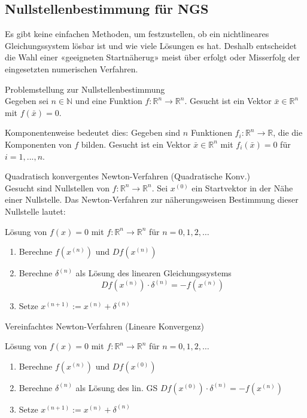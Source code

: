 \raggedcolumns
\columnbreak

\subsection{Nullstellenbestimmung für NGS}

\begin{remark}
    Es gibt keine einfachen Methoden, um festzustellen, ob ein nichtlineares Gleichungssystem lösbar ist und wie viele Lösungen es hat. Deshalb entscheidet die Wahl
    einer «geeigneten Startnäherug» meist über erfolgt oder Misserfolg der eingesetzten numerischen Verfahren.
\end{remark}

\begin{definition}{Problemstellung zur Nullstellenbestimmung}\\
Gegeben sei $n \in \mathbb{N}$ und eine Funktion $f: \mathbb{R}^n \rightarrow \mathbb{R}^n$. Gesucht ist ein Vektor $\bar{x} \in \mathbb{R}^n$ mit $f(\bar{x}) = 0$.

Komponentenweise bedeutet dies: Gegeben sind $n$ Funktionen $f_i: \mathbb{R}^n \rightarrow \mathbb{R}$, die die Komponenten von $f$ bilden. Gesucht ist ein Vektor $\bar{x} \in \mathbb{R}^n$ mit $f_i(\bar{x}) = 0$ für $i = 1, ..., n$.
\end{definition}

\begin{concept}{Quadratisch konvergentes Newton-Verfahren} \small{(Quadratische Konv.)}\\
    \normalsize
    Gesucht sind Nullstellen von $f: \mathbb{R}^n \rightarrow \mathbb{R}^n$. Sei $x^{(0)}$ ein Startvektor in der Nähe einer Nullstelle. 
    Das Newton-Verfahren zur näherungsweisen Bestimmung dieser Nullstelle lautet:

    Lösung von $f(x)=0$ mit $f: \mathbb{R}^n \rightarrow \mathbb{R}^n$ für $n=0,1,2, \ldots$
    \begin{enumerate}
        \item Berechne $f(x^{(n)})$ und $D f(x^{(n)})$
        \item Berechne $\delta^{(n)}$ als Lösung des linearen Gleichungssystems
        $$Df(x^{(n)}) \cdot \delta^{(n)} = -f(x^{(n)})$$
        \item Setze $x^{(n+1)} := x^{(n)} + \delta^{(n)}$
    \end{enumerate}
\end{concept}

\begin{theorem}{Vereinfachtes Newton-Verfahren} (Lineare Konvergenz)

    Lösung von $f(x)=0$ mit $f: \mathbb{R}^n \rightarrow \mathbb{R}^n$ für $n=0,1,2, \ldots$
    \begin{enumerate}
        \item Berechne $f(x^{(n)})$ und $D f(x^{(0)})$
        \item Berechne $\delta^{(n)}$ als Lösung des lin. GS $D f\left(x^{(0)}\right) \cdot \delta^{(n)}=-f\left(x^{(n)}\right)$
        \item Setze $x^{(n+1)}:=x^{(n)}+\delta^{(n)}$
    \end{enumerate}
\end{theorem}

